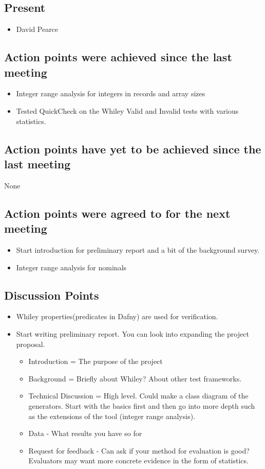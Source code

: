 \documentclass[]{article}
\begin{document}
\subsection{Present}
\begin{itemize}
	\item David Pearce
\end{itemize}

\subsection{Action points were achieved since the last meeting}
\begin{itemize}
	\item Integer range analysis for integers in records and array sizes
	\item Tested QuickCheck on the Whiley Valid and Invalid tests with various statistics.
\end{itemize}

\subsection{Action points have yet to be achieved since the last meeting}
None
\subsection{Action points were agreed to for the next meeting}
\begin{itemize}
	\item Start introduction for preliminary report and a bit of the background survey.
	\item Integer range analysis for nominals
\end{itemize}

\subsection{Discussion Points}
\begin{itemize}
 \item Whiley properties(predicates in Dafny) are used for verification.
 \item Start writing preliminary report. You can look into expanding the project proposal.
 \begin{itemize}
 	 \item Introduction = The purpose of the project
 	\item Background = Briefly about Whiley? About other test frameworks.
 	\item Technical Discussion = High level. Could make a class diagram of the generators. Start with the basics first and then go into more depth such as the extensions of the tool (integer range analysis).
 	\item Data - What results you have so for
 	\item Request for feedback - Can ask if your method for evaluation is good? Evaluators may want more concrete evidence in the form of statistics.
 \end{itemize}
\end{itemize}
\end{document}
